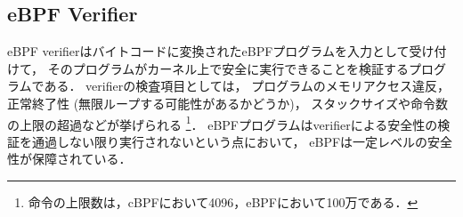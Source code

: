 \subsection{eBPF Verifier}
eBPF verifierはバイトコードに変換されたeBPFプログラムを入力として受け付けて，
そのプログラムがカーネル上で安全に実行できることを検証するプログラムである．
verifierの検査項目としては，
プログラムのメモリアクセス違反，正常終了性 (無限ループする可能性があるかどうか)，
スタックサイズや命令数の上限の超過などが挙げられる
\footnote{命令の上限数は，cBPFにおいて4096，eBPFにおいて100万である．}．
eBPFプログラムはverifierによる安全性の検証を通過しない限り実行されないという点において，
eBPFは一定レベルの安全性が保障されている．


